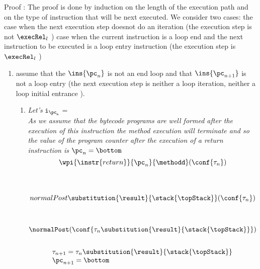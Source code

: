 	Proof :
The proof is done by induction on the length of the execution path and on the type of instruction that will be next executed. 
We consider two cases: the case when the next execution step doesnot do an iteration (the execution step is not  $\execRel_l$ ) 
case when the current instruction is a loop end and the next instruction to be executed is a loop entry instruction (the execution step is $\execRel_l$ ) 
  
\begin{enumerate}
  \item assume that the  $\ins{{\pc_{n}}}$ is not an end loop and that $\ins{{\pc_{n + 1}}}$ is not a loop entry 
  (the next execution step is neither a loop iteration, neither a loop initial entrance ).  
   \begin{enumerate} 
		\item   \textit{Let's} $\tt{i_{\pc_n}}$ = \\
		    	\textit{ As we assume that the bytecode programs are well formed after the execution of this instruction
 			the method execution will terminate and so the value of the program counter after the execution of a return
			instruction is} $\pc_n = \bottom$ \\
			$$\wpi{ \instr{return}}{\pc_n}{\methodd}(\conf{\state{n}}) $$\\
			\\
			 
                        $$ normalPost \substitution{ \result }{\stack{\topStack} } (\conf{\state{n}}) $$\\
			\\
			$ \normalPost (\conf{\state{n}\substitution{\result}{\stack{\topStack}} } )  $\\
			
			  \\
		
	 	$$ 
		\begin{array}{l}
		   \state{n + 1} = \state{n}\substitution{\result}{ \stack{\topStack}} \\
		   \pc_{n+1} = \bottom 
		\end{array} $$\\


\end{enumerate}
\end{enumerate}
